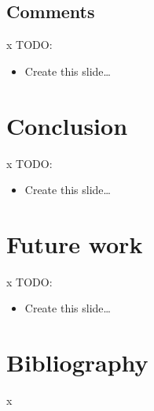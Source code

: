 \documentclass{beamer}
\begin{document}
\subsection{Comments}
\begin{frame}{x}{}
TODO:
\begin{itemize}
\item Create this slide\ldots
\end{itemize}
\end{frame}



\section{Conclusion}
\begin{frame}{x}{}
TODO:
\begin{itemize}
\item Create this slide\ldots
\end{itemize}
\end{frame}



\section{Future work}
\begin{frame}{x}{}
TODO:
\begin{itemize}
\item Create this slide\ldots
\end{itemize}
\end{frame}



\section*{Bibliography}
\begin{frame}[allowframebreaks]{x}{}
\nocite{all, the, things}

\tiny{}
\end{frame}
\end{document}
